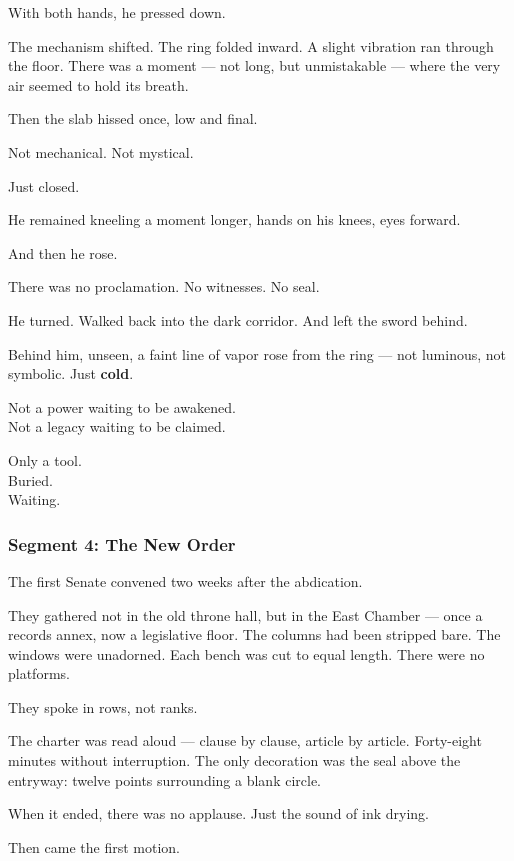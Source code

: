 \documentclass[9pt]{article}
\begin{document}
With both hands, he pressed down.

The mechanism shifted. The ring folded inward. A slight vibration ran through the floor. There was a moment --- not long, but unmistakable --- where the very air seemed to hold its breath.

Then the slab hissed once, low and final.

Not mechanical. Not mystical.

Just closed.

He remained kneeling a moment longer, hands on his knees, eyes forward.

And then he rose.

There was no proclamation. No witnesses. No seal.

He turned. Walked back into the dark corridor. And left the sword behind.

\vspace{1em}

Behind him, unseen, a faint line of vapor rose from the ring --- not luminous, not symbolic. Just \textbf{cold}.

Not a power waiting to be awakened.\\
Not a legacy waiting to be claimed.

Only a tool.\\
Buried.\\
Waiting.

\newpage

\subsubsection*{Segment 4: The New Order}

The first Senate convened two weeks after the abdication.

They gathered not in the old throne hall, but in the East Chamber --- once a records annex, now a legislative floor. The columns had been stripped bare. The windows were unadorned. Each bench was cut to equal length. There were no platforms.

They spoke in rows, not ranks.

The charter was read aloud --- clause by clause, article by article. Forty-eight minutes without interruption. The only decoration was the seal above the entryway: twelve points surrounding a blank circle.

When it ended, there was no applause. Just the sound of ink drying.

Then came the first motion.
\end{document}
